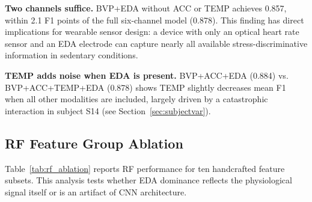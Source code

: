 \documentclass[10pt,twocolumn]{article}
\begin{document}
\textbf{Two channels suffice.} BVP+EDA without ACC or TEMP achieves 0.857,
within 2.1 F1 points of the full six-channel model (0.878). This finding
has direct implications for wearable sensor design: a device with only an
optical heart rate sensor and an EDA electrode can capture nearly all
available stress-discriminative information in sedentary conditions.

\textbf{TEMP adds noise when EDA is present.} BVP+ACC+EDA (0.884) vs.
BVP+ACC+TEMP+EDA (0.878) shows TEMP slightly decreases mean F1 when
all other modalities are included, largely driven by a catastrophic
interaction in subject S14 (see Section~\ref{sec:subjectvar}).

\subsection{RF Feature Group Ablation}
\label{sec:rf_ablation}

Table~\ref{tab:rf_ablation} reports RF performance for ten handcrafted
feature subsets. This analysis tests whether EDA dominance reflects the
physiological signal itself or is an artifact of CNN architecture.

\begin{table}[t]
  \centering
  \caption{RF feature group ablation. Mean F1 $\pm$ std across 15 LOSO folds.}
  \label{tab:rf_ablation}
  \small
  \setlength{\tabcolsep}{4pt}
\end{table}
\end{document}
